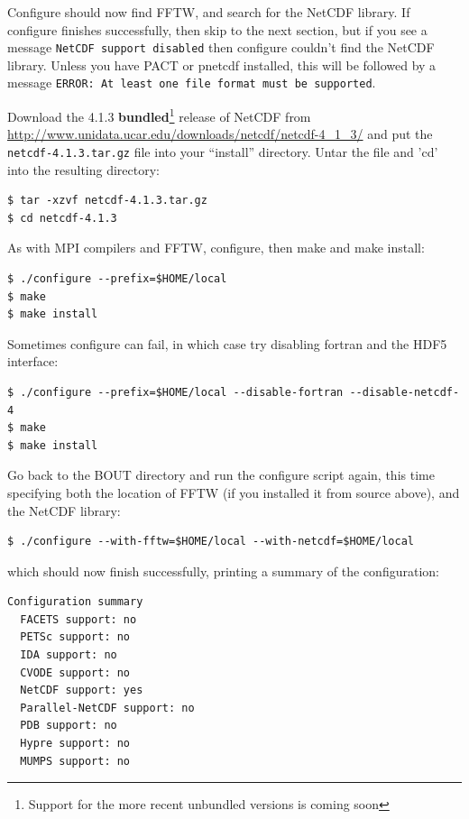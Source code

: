\documentclass[12pt]{article}
\begin{document}
Configure should now find FFTW, and search for the NetCDF library. If
configure finishes successfully, then skip to the next section, but if you
see a message \texttt{NetCDF support disabled} then configure couldn't find
the NetCDF library. Unless you have PACT or pnetcdf installed, this will be
followed by a message \texttt{ERROR: At least one file format must be supported}. 

Download the 4.1.3 {\bf bundled}\footnote{Support for the more recent unbundled versions is coming soon} release of NetCDF from \url{http://www.unidata.ucar.edu/downloads/netcdf/netcdf-4_1_3/} and put the \texttt{netcdf-4.1.3.tar.gz} file into your ``install'' directory. Untar the file and 'cd' into the resulting directory:
\begin{verbatim}
$ tar -xzvf netcdf-4.1.3.tar.gz
$ cd netcdf-4.1.3
\end{verbatim}
As with MPI compilers and FFTW, configure, then make and make install:
\begin{verbatim}
$ ./configure --prefix=$HOME/local
$ make
$ make install
\end{verbatim}
Sometimes configure can fail, in which case try disabling fortran and the
HDF5 interface:
\begin{verbatim}
$ ./configure --prefix=$HOME/local --disable-fortran --disable-netcdf-4
$ make
$ make install
\end{verbatim}


Go back to the BOUT directory and run the configure script again, 
this time specifying both the location of FFTW (if you installed it 
from source above), and the NetCDF library:
\begin{verbatim}
$ ./configure --with-fftw=$HOME/local --with-netcdf=$HOME/local
\end{verbatim}

which should now finish successfully, printing a summary of the configuration:
\begin{verbatim}
Configuration summary
  FACETS support: no
  PETSc support: no
  IDA support: no
  CVODE support: no
  NetCDF support: yes
  Parallel-NetCDF support: no
  PDB support: no
  Hypre support: no
  MUMPS support: no
\end{verbatim}
\end{document}
